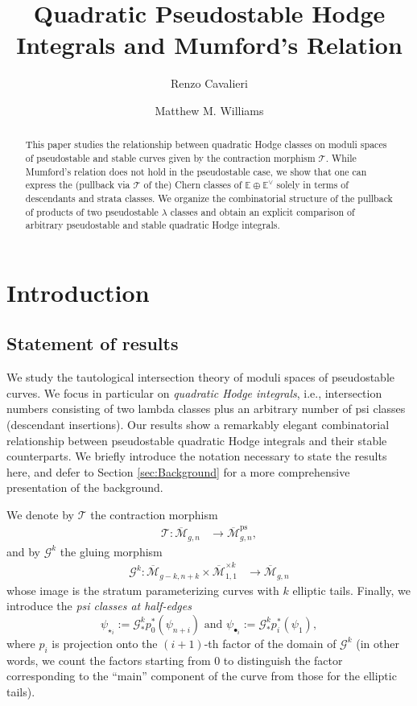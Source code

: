 \documentclass[leqno,12pt]{amsart}
\title{Quadratic Pseudostable Hodge Integrals and Mumford's Relation}
\author{Renzo Cavalieri}
\author{Matthew M. Williams}
\theoremstyle{remark}
\numberwithin{equation}{section}
\DeclareMathOperator{\ps}{ps}
\begin{document}
\begin{abstract} This paper studies the relationship between quadratic Hodge classes on moduli spaces of pseudostable and stable curves given by the contraction morphism $\mathcal{T}.$ While Mumford's relation does not hold in the pseudostable case, we show that one can express the (pullback via $\mathcal{T}$ of the) Chern classes of $\mathbb{E}\oplus \mathbb{E}^\vee$ solely in terms of descendants and strata classes. We organize the combinatorial structure of the pullback of products of two pseudostable $\lambda$ classes and obtain an explicit comparison of arbitrary pseudostable and stable quadratic Hodge integrals.
\end{abstract}

\maketitle


\section{Introduction}
\subsection{Statement of results}

We study the tautological intersection theory of moduli spaces of pseudostable curves. We focus in particular on {\it quadratic Hodge integrals}, i.e., intersection numbers consisting of two lambda classes plus an arbitrary number of psi classes (descendant insertions). Our results show a remarkably elegant combinatorial relationship between pseudostable quadratic Hodge integrals and their stable counterparts. We briefly introduce the notation necessary to state the results here, and defer to Section \ref{sec:Background} for a more comprehensive presentation of the  background.

We denote by $\mathcal{T}$ the contraction morphism
\begin{align}
        \mathcal{T}: \overline{\mathcal{M}}_{g, n} &\rightarrow \overline{\mathcal{M}}^{\ps}_{g, n},
\end{align}
and by $\mathcal{G}^k$  the gluing morphism 
\begin{align}
        \mathcal{G}^k: \overline{\mathcal{M}}_{g-k, n+k} \times \overline{\mathcal{M}}^{\times k}_{1, 1} &\rightarrow \overline{\mathcal{M}}_{g, n}
\end{align}
whose image is the stratum parameterizing curves with $k$ elliptic tails.
Finally, we introduce the {\it psi classes at half-edges} 
\begin{equation}
 \psi_{\star_i} := \mathcal{G}^k_\ast p_0^\ast(\psi_{n+i})   \text{ and } \psi_{\bullet_i} := \mathcal{G}^k_\ast p_i^\ast(\psi_1),
\end{equation}
where $p_i$ is projection onto the $(i+1)$-th factor of the domain of $\mathcal{G}^k$ (in other words, we count the factors starting from $0$ to distinguish the factor corresponding to the ``main'' component of the curve from those for the elliptic tails).
\end{document}
